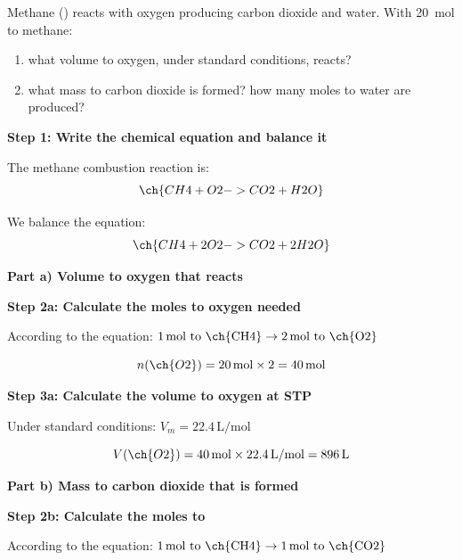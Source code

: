 \begin{exercise}
    Methane () reacts with oxygen producing carbon dioxide and water.
    With \qty{20}{\mol} to methane:
    \begin{enumerate}[label=\letraminuscula]
    \item what volume to oxygen, under standard conditions, reacts?
    \item what mass to carbon dioxide is formed?
    how many moles to water are produced?
    \end{enumerate}
    \begin{solu}
        \textbf{Step 1: Write the chemical equation and balance it}

        The methane combustion reaction is:
        \begin{equation*}
            \ch{CH4 + O2 -> CO2 + H2O}
        \end{equation*}

        We balance the equation:
        \begin{equation*}
            \ch{CH4 + 2 O2 -> CO2 + 2 H2O}
        \end{equation*}

        \textbf{Part a) Volume to oxygen that reacts}

        \textbf{Step 2a: Calculate the moles to oxygen needed}

        According to the equation: $1\,\text{mol to \ch{CH4}} \rightarrow 2\,\text{mol to \ch{O2}}$

        \begin{equation*}
            n(\ch{O2}) = 20\,\text{mol} \times 2 = 40\,\text{mol}
        \end{equation*}

        \textbf{Step 3a: Calculate the volume to oxygen at STP}

        Under standard conditions: $V_m = 22.4\,\text{L/mol}$

        \begin{equation*}
            V(\ch{O2}) = 40\,\text{mol} \times 22.4\,\text{L/mol} = 896\,\text{L}
        \end{equation*}

        \textbf{Part b) Mass to carbon dioxide that is formed}

        \textbf{Step 2b: Calculate the moles to }

        According to the equation: $1\,\text{mol to \ch{CH4}} \rightarrow 1\,\text{mol to \ch{CO2}}$


\end{solu}
\end{exercise}
